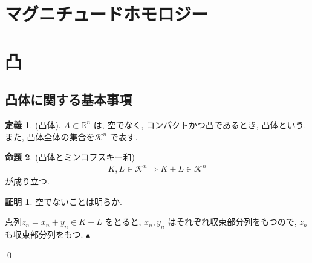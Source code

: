 \documentclass[10pt, fleqn, label-section=none]{bxjsarticle}
\theoremstyle{definition}
\newtheorem{dfn}{定義}[section]
\newtheorem{prop}[dfn]{命題}
\newtheorem*{pf*}{証明}
\newcommand{\naraba}{\Rightarrow}
\renewcommand{\;}{\, ; \,}
\newenvironment{claim}[1]{\par\noindent\underline{step:}\space#1}{}
\newenvironment{claimproof}[1]{\par\noindent{($\because$)}\space#1}{\hfill $\blacktriangle $}
\begin{document}
\section{マグニチュードホモロジー}




















\section{凸}



\subsection{凸体に関する基本事項}





\begin{dfn}(凸体). $A \subset \mathbb R^n$ は, 空でなく, コンパクトかつ凸であるとき, 凸体という. また, 凸体全体の集合を$\mathcal K^n$ で表す.

\end{dfn}

\begin{prop}(凸体とミンコフスキー和) 
\begin{align*} K, L \in \mathcal K ^n \naraba K + L \in \mathcal K ^n \end{align*}
が成り立つ.
\end{prop}
\begin{pf*}空でないことは明らか. 
\begin{claimproof}
点列$z_n = x_n + y_n \in K+ L$ をとると, $x_n, y_n$ はそれぞれ収束部分列をもつので, $z_n$ も収束部分列をもつ.  
\end{claimproof}

\qed
\end{pf*}
\end{document}
